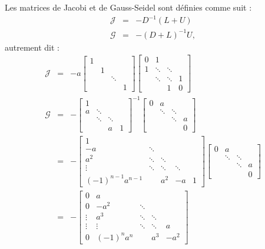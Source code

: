 Les matrices de Jacobi et de Gauss-Seidel sont définies comme suit : 
\begin{eqnarray}
\mathcal{J} &=& -D^{-1}(L+U)\\
\mathcal{G} &=& -(D+L)^{-1}U,
\end{eqnarray}
autrement dit :
\begin{eqnarray}
\mathcal{J} &=& - a
\left[ 
\begin{array}{cccc}
1 & & &\\
 & 1 & &\\
 & & \ddots & \\
  & & & 1
\end{array} 
\right] 
\left[ 
\begin{array}{cccc}
0 & 1& &\\
1 & \ddots & \ddots &\\
 & \ddots & \ddots & 1 \\
  & & 1 & 0
\end{array} 
\right]\\
\mathcal{G} & = & -  
\left[ 
\begin{array}{cccc}
1 & & &\\
a & \ddots &  &\\
 & \ddots & \ddots  &  \\
  & & a & 1
\end{array} 
\right] ^{-1}
\left[ 
\begin{array}{cccc}
0 & a & &\\
 & \ddots &  \ddots &\\
 &  & \ddots  & a \\
  & &  & 0
\end{array} 
\right] 
\\
&=& -
\left[ 
\begin{array}{ccccc}
1 & & & &\\
-a & \ddots &  & &\\
a^2 & \ddots & \ddots  &  &\\
 \vdots & \ddots & \ddots & \ddots & \\
(-1)^{n-1}a^{n-1} & & a^2 & -a & 1
\end{array} 
\right]
\left[ 
\begin{array}{cccc}
0 & a & &\\
 & \ddots &  \ddots &\\
 &  & \ddots  & a \\
  & &  & 0
\end{array} 
\right]\\
&=& -
\left[ 
\begin{array}{ccccc}
0 & a & & &\\
0 & -a^2 & \ddots  & &\\
\vdots & a^3 & \ddots & \ddots  &\\
\vdots & \vdots & \ddots & \ddots  & a \\
0 & (-1)^n a^n & & a^3 & -a^2
\end{array} 
\right]
\end{eqnarray}

